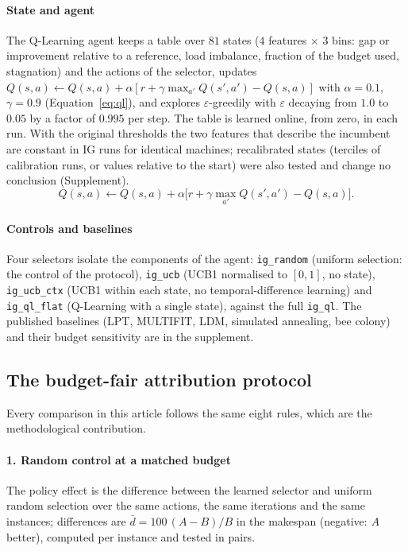 \paragraph{State and agent}
\label{sec:state}
\label{sec:qlm}
The Q-Learning agent keeps a table over $81$ states ($4$ features $\times$ $3$ bins: gap or improvement relative to a reference, load imbalance, fraction of the budget used, stagnation) and the
actions of the selector, updates $Q(s,a)\leftarrow Q(s,a)+\alpha[r+\gamma\max_{a'}Q(s',a')-Q(s,a)]$ with $\alpha=0.1$, $\gamma=0.9$ (Equation~\ref{eq:ql}), and explores
$\varepsilon$-greedily with $\varepsilon$ decaying from $1.0$ to $0.05$ by a factor of $0.995$ per step. The table is learned online, from zero, in each run. With the original thresholds the
two features that describe the incumbent are constant in IG runs for identical machines; recalibrated states (terciles of calibration runs, or values relative to the start) were also tested and
change no conclusion (Supplement).
\begin{equation}
  Q(s,a) \leftarrow Q(s,a) + \alpha \bigl[ r + \gamma \max_{a'} Q(s', a') - Q(s,a) \bigr].
  \label{eq:ql}
\end{equation}

\paragraph{Controls and baselines}
\label{sec:igvariants}
Four selectors isolate the components of the agent: \texttt{ig\_random} (uniform selection: the control of the protocol), \texttt{ig\_ucb} (UCB1 normalised to $[0,1]$, no state),
\texttt{ig\_ucb\_ctx} (UCB1 within each state, no temporal-difference learning) and \texttt{ig\_ql\_flat} (Q-Learning with a single state), against the full \texttt{ig\_ql}. The published
baselines (LPT, MULTIFIT, LDM, simulated annealing, bee colony) and their budget sensitivity are in the supplement.

\subsection{The budget-fair attribution protocol}
\label{sec:protocol}

Every comparison in this article follows the same eight rules, which are the methodological contribution.

\paragraph{1. Random control at a matched budget}
The policy effect is the difference between the learned selector and uniform random selection over the same actions, the same iterations and the same instances; differences are
$\bar d=100\,(A-B)/B$ in the makespan (negative: $A$ better), computed per instance and tested in pairs.

